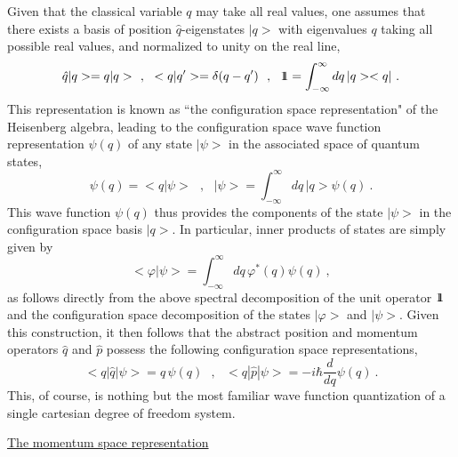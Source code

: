 \documentclass[a4paper,11pt]{article}
\def\one{1\hskip -.37em 1}
\begin{document}
Given that the classical variable $q$ may take all real values, one
assumes that there exists a basis of position $\hat{q}$-eigenstates
$|q>$ with eigenvalues $q$ taking all possible real values, and
normalized to unity on the real line,
\begin{equation}
\hat{q}|q>=q|q>\ \ ,\ \ <q|q'>=\delta(q-q')\ \ ,\ \ 
\one=\int_{-\infty}^\infty dq\,|q><q|\ .
\end{equation}
This representation is known as ``the configuration space representation" of 
the Heisenberg algebra, leading to the configuration space wave function
re\-pre\-sen\-ta\-tion $\psi(q)$ of any state $|\psi>$ in the associated 
space of quantum states,
\begin{equation}
\psi(q)=<q|\psi>\ \ \ ,\ \ \ 
|\psi>=\int_{-\infty}^\infty dq\,|q>\psi(q)\ .
\end{equation}
This wave function $\psi(q)$ thus provides the components of the state 
$|\psi>$ in the configuration space basis $|q>$. In particular, inner 
products of states are simply given by
\begin{equation}
<\varphi|\psi>=\int_{-\infty}^\infty dq\,\varphi^*(q)\psi(q)\ ,
\end{equation}
as follows directly from the above spectral decomposition of the unit
ope\-ra\-tor $\one$ and the configuration space decomposition of the
states $|\varphi>$ and $|\psi>$. Given this construction, it then follows
that the abstract position and momentum operators $\hat{q}$ and $\hat{p}$
possess the following configuration space re\-pre\-sen\-tations,
\begin{equation}
<q|\hat{q}|\psi>=q\,\psi(q)\ \ \ ,\ \ \
<q|\hat{p}|\psi>=-i\hbar\frac{d}{dq}\psi(q)\ .
\end{equation}
This, of course, is nothing but the most familiar wave function quantization
of a single cartesian degree of freedom system.

\vspace{10pt}

\noindent\underline{The momentum space representation}

\vspace{10pt}
\end{document}
